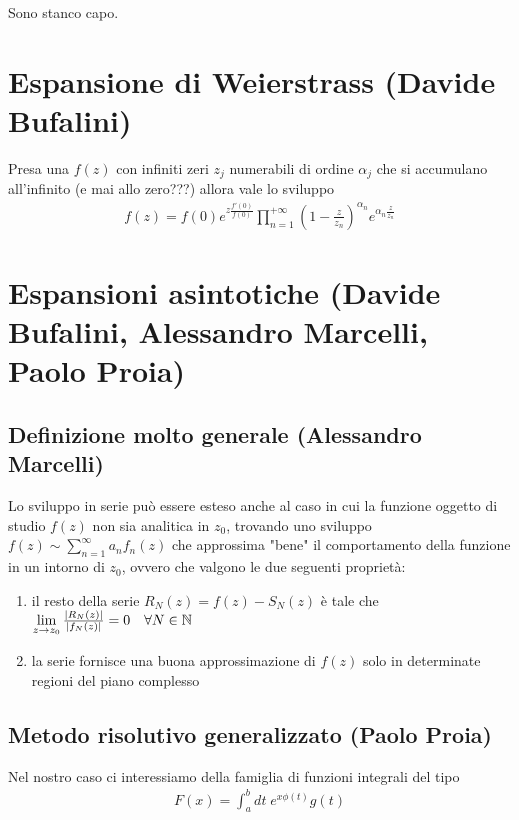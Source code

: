 Sono stanco capo.




\section{Espansione di Weierstrass (Davide Bufalini)}
Presa una $f(z)$ con infiniti zeri $z_j$ numerabili di ordine $\alpha_j$ che si accumulano all'infinito (e mai allo zero???) allora vale lo sviluppo
\begin{align}
	f(z) =f(0) e^{z\frac{f'(0)}{f(0)}} \prod_{n=1}^{+\infty}\left( 1 - \frac{z}{z_n} \right)^{\alpha_n} e^{\alpha_n \frac{z}{z_n}}
\end{align}

\newpage

\section{Espansioni asintotiche (Davide Bufalini, Alessandro Marcelli, Paolo Proia)}

\subsection{Definizione molto generale (Alessandro Marcelli)}

Lo sviluppo in serie può essere esteso anche al caso in cui la funzione oggetto di studio $f(z)$ non sia analitica in $z_0$, trovando uno sviluppo $f(z) \sim \sum_{n=1}^{\infty} a_n f_n(z)$ che approssima "bene" il comportamento della funzione in un intorno di $z_0$, ovvero che valgono le due seguenti proprietà:
\begin{enumerate}
	\item il resto della serie $R_N(z) = f(z) - S_N(z)$ è tale che $\underset{z \rightarrow z_0}{\lim} \, \frac{|R_N(z)|}{|f_N(z)|} = 0 \quad \forall N\in \mathbb{N}$
	\item la serie fornisce una buona approssimazione di $f(z)$ solo in determinate regioni del piano complesso
\end{enumerate}

\subsection{Metodo risolutivo generalizzato (Paolo Proia)}

Nel nostro caso ci interessiamo della famiglia di funzioni integrali del tipo
\begin{align}
	F(x) = \int_{a}^{b} dt \; e^{x\phi(t)}g(t) \label{lol0}
\end{align}

